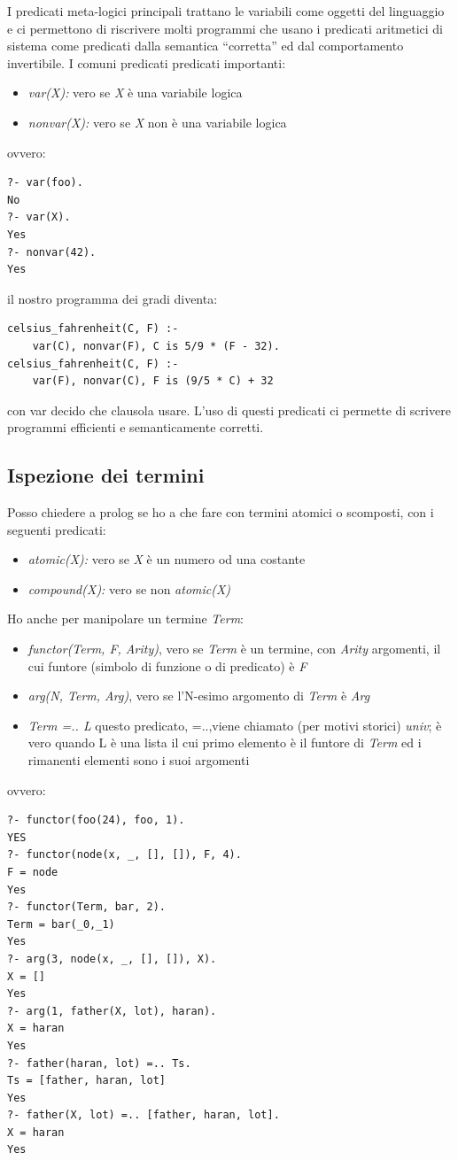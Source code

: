 \documentclass[a4paper]{report}
\begin{document}
I predicati meta-logici principali trattano le variabili come oggetti del linguaggio e ci permettono di riscrivere molti programmi che usano i predicati aritmetici di sistema come predicati dalla semantica “corretta” ed dal comportamento invertibile.
I comuni predicati predicati importanti:
\begin{itemize}
\item \textit{var(X):}  vero se \textit{X} è una variabile logica
\item \textit{nonvar(X):}  vero se \textit{X} non è una variabile logica
\end{itemize}
ovvero:
\begin{verbatim}
?- var(foo).
No
?- var(X).
Yes
?- nonvar(42).
Yes
\end{verbatim}
il nostro programma dei gradi diventa:
\begin{verbatim}
celsius_fahrenheit(C, F) :- 
	var(C), nonvar(F), C is 5/9 * (F - 32).
celsius_fahrenheit(C, F) :- 
	var(F), nonvar(C), F is (9/5 * C) + 32
\end{verbatim}
con var decido che clausola usare. L'uso di questi predicati ci permette di scrivere programmi efficienti e semanticamente corretti.
\subsection{Ispezione dei termini}
Posso chiedere a prolog se ho a che fare con termini atomici o scomposti, con i seguenti predicati:
\begin{itemize}
\item \textit{atomic(X): }vero se \textit{X} è un numero od una costante
\item \textit{compound(X):} vero se non \textit{atomic(X)}
\end{itemize}
Ho anche per manipolare un termine \textit{Term}:
\begin{itemize}
\item \textit{functor(Term, F, Arity)},
vero se \textit{Term} è un termine, con\textit{ Arity }argomenti, il cui funtore (simbolo di funzione o di predicato) è \textit{F}
\item \textit{arg(N, Term, Arg)},
vero se l’N-esimo argomento di \textit{Term }è \textit{Arg}
\item \textit{Term =.. L}
questo predicato, =..,viene chiamato (per motivi storici) \textit{univ}; è vero quando L è una lista il cui primo elemento è il funtore di \textit{Term} ed i rimanenti elementi sono i suoi argomenti
\end{itemize}
ovvero:
\begin{verbatim}
?- functor(foo(24), foo, 1).
YES
?- functor(node(x, _, [], []), F, 4).
F = node
Yes
?- functor(Term, bar, 2).
Term = bar(_0,_1)
Yes
?- arg(3, node(x, _, [], []), X).
X = []
Yes
?- arg(1, father(X, lot), haran).
X = haran
Yes
?- father(haran, lot) =.. Ts.
Ts = [father, haran, lot]
Yes
?- father(X, lot) =.. [father, haran, lot].
X = haran
Yes
\end{verbatim}
\end{document}

